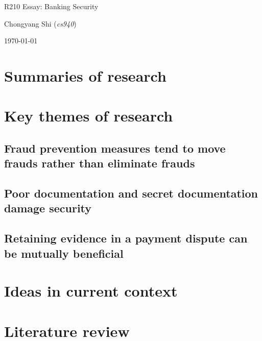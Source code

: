 \documentclass[11pt]{article}
\begin{document}
\centerline{\Large R210 Essay:  Banking Security}
\vspace{2em}
\centerline{\large Chongyang Shi (\emph{cs940})}
\vspace{1em}
\centerline{\large \today}
\vspace{1em}

\section{Summaries of research}


\section{Key themes of research}

\subsection{Fraud prevention measures tend to move frauds rather than eliminate frauds}


\subsection{Poor documentation and secret documentation damage security}


\subsection{Retaining evidence in a payment dispute can be mutually beneficial}

 
\section{Ideas in current context}

\section{Literature review}



\footnotesize{}
\end{document}
